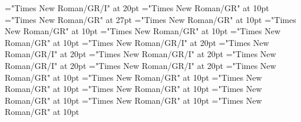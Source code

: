 \documentclass[a4paper]{article}
\begin{document}
\pagestyle{plain}
\sloppy
\setlength{\parfillskip}{0pt plus 1fil}
\font\pronunciationenUKpronunciationbefore="Times New Roman/GR/I" at 20pt
\font\sectionletterdictionary="Times New Roman/GR" at 10pt
\font\headsectionletterdictionary="Times New Roman/GR" at 27pt
\font\articledictionary="Times New Roman/GR" at 10pt
\font\firstoftypeheadwordlastoftypearticledictionary="Times New Roman/GR" at 10pt
\font\firstoftypegrammarrequireslastoftypearticledictionary="Times New Roman/GR" at 10pt
\font\firstoftypelastoftyperelationsynonymarticledictionary="Times New Roman/GR" at 10pt
\font\firstoftypepronunciationenUKarticledictionary="Times New Roman/GR/I" at 20pt
\font\lastoftypepronunciationenUSarticledictionary="Times New Roman/GR/I" at 20pt
\font\pronunciationpronunciationbeforearticledictionary="Times New Roman/GR/I" at 20pt
\font\lastoftypepronunciationenUKarticledictionary="Times New Roman/GR/I" at 20pt
\font\pronunciationenUKpronunciationbeforearticledictionary="Times New Roman/GR/I" at 20pt
\font\firstoftypegrammarcategorylastoftypearticledictionary="Times New Roman/GR" at 10pt
\font{}="Times New Roman/GR" at 10pt
\font\firstoftypelastoftypenotearticledictionary="Times New Roman/GR" at 10pt
\font\exampleusefirstoftypearticledictionary="Times New Roman/GR" at 10pt
\font\examplefirstoftypearticledictionary="Times New Roman/GR" at 10pt
\font\exampleuselastoftypearticledictionary="Times New Roman/GR" at 10pt
\font\examplelastoftypearticledictionary="Times New Roman/GR" at 10pt

\mbox{} 
\newpage 
\newpage 
\setcounter{page}{1} 
\pagestyle{fancy} 
\begin{center}
\end{center}

\pronunciationpronunciationbeforearticledictionary{, }
\end{document}
